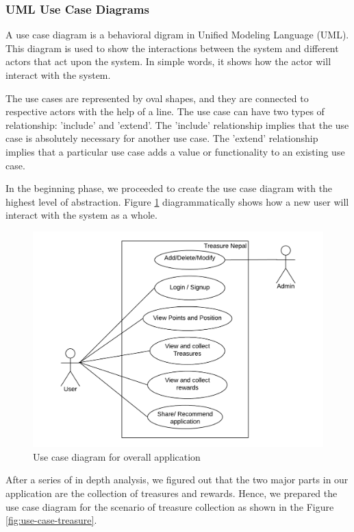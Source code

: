 \documentclass[12pt, a4paper, oneside]{article}
\begin{document}
\subsubsection{UML Use Case Diagrams} \label{usecasediagrams}
A use case diagram is a behavioral digram in Unified Modeling Language (UML). This diagram is used to show the interactions between the system and different actors that act upon the system. In simple words, it shows how the actor will interact with the system. 

The use cases are represented by oval shapes, and they are connected to respective actors with the help of a line. The use case can have two types of relationship: 'include' and 'extend'. The 'include' relationship implies that the use case is absolutely necessary for another use case. The 'extend' relationship implies that a particular use case adds a value or functionality to an existing use case.

In the beginning phase, we proceeded to create the use case diagram with the highest level of abstraction. Figure \ref{fig:use-case-all} diagrammatically shows how a new user will interact with the system as a whole.

\begin{figure}[H]
\includegraphics[width=\linewidth]{use-case-diagrams/all.png}
\centering
\caption{Use case diagram for overall application}
\label{fig:use-case-all}
\end{figure}

After a series of in depth analysis, we figured out that the two major parts in our application are the collection of treasures and rewards. Hence, we prepared the use case diagram for the scenario of treasure collection as shown in the Figure \ref{fig:use-case-treasure}. 
\end{document}
